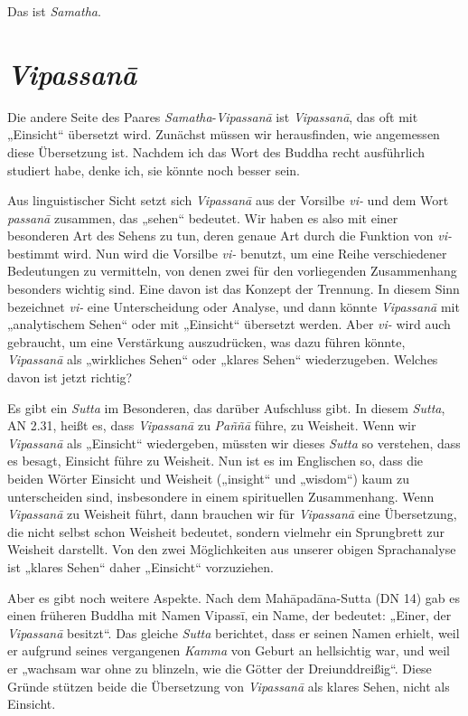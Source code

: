 \documentclass[12pt,openany]{book}
\begin{document}
Das ist \textit{Samatha}.

\section*{\textit{Vipas\-sanā}}

Die andere Seite des Paares \textit{Samatha}-\textit{Vipas\-sanā} ist \textit{Vipas\-sanā}, das oft mit „Einsicht“ übersetzt wird. Zunächst müssen wir herausfinden, wie angemessen diese Übersetzung ist. Nachdem ich das Wort des Buddha recht ausführlich studiert habe, denke ich, sie könnte noch besser sein.

Aus linguistischer Sicht setzt sich \textit{Vipas\-sanā} aus der Vorsilbe \textit{vi-} und dem Wort \textit{passanā} zusammen, das „sehen“ bedeutet. Wir haben es also mit einer besonderen Art des Sehens zu tun, deren genaue Art durch die Funktion von \textit{vi-} bestimmt wird. Nun wird die Vorsilbe \textit{vi-} benutzt, um eine Reihe verschiedener Bedeutungen zu vermitteln, von denen zwei für den vorliegenden Zusammenhang besonders wichtig sind. Eine davon ist das Konzept der Trennung. In diesem Sinn bezeichnet \textit{vi-} eine Unterscheidung oder Analyse, und dann könnte \textit{Vipas\-sanā} mit „analytischem Sehen“ oder mit „Einsicht“ übersetzt werden. Aber \textit{vi-} wird auch gebraucht, um eine Verstärkung auszudrücken, was dazu führen könnte, \textit{Vipas\-sanā} als „wirkliches Sehen“ oder „klares Sehen“ wiederzugeben. Welches davon ist jetzt richtig?

Es gibt ein \textit{Sutta} im Besonderen, das da\-rüber Aufschluss gibt. In diesem \textit{Sutta}, AN 2.31, heißt es, dass \textit{Vipas\-sanā} zu \textit{Paññā} führe, zu Weisheit. Wenn wir \textit{Vipas\-sanā} als „Einsicht“ wiedergeben, müssten wir dieses \textit{Sutta} so verstehen, dass es besagt, Einsicht führe zu Weisheit. Nun ist es im Englischen so, dass die beiden Wörter Einsicht und Weisheit („insight“ und „wisdom“) kaum zu unterscheiden sind, insbesondere in einem spirituellen Zusammenhang. Wenn \textit{Vipas\-sanā} zu Weisheit führt, dann brauchen wir für \textit{Vipas\-sanā} eine Übersetzung, die nicht selbst schon Weisheit bedeutet, sondern vielmehr ein Sprungbrett zur Weisheit darstellt. Von den zwei Möglichkeiten aus unserer obigen Sprachanalyse ist „klares Sehen“ daher „Einsicht“ vorzuziehen.

Aber es gibt noch weitere Aspekte. Nach dem Mahāpadāna-Sutta (DN 14) gab es einen früheren Buddha mit Namen Vipassī, ein Name, der bedeutet: „Einer, der \textit{Vipas\-sanā} besitzt“. Das gleiche \textit{Sutta} berichtet, dass er seinen Namen erhielt, weil er aufgrund seines vergangenen \textit{Kamma} von Geburt an hellsichtig war, und weil er „wachsam war ohne zu blinzeln, wie die Götter der Dreiunddreißig“. Diese Gründe stützen beide die Übersetzung von \textit{Vipas\-sanā} als klares Sehen, nicht als Einsicht.
\end{document}
